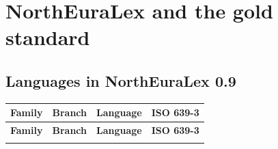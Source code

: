\appendix

\chapter{NorthEuraLex and the gold standard}
\section{Languages in NorthEuraLex 0.9}

\begin{center}
\small
\begin{longtable}{llll}
\hline\hline
\textbf{Family} & \textbf{Branch} & \textbf{Language} & \textbf{ISO 639-3}\\
\hline
\endfirsthead
\hline\hline
\textbf{Family} & \textbf{Branch} & \textbf{Language} & \textbf{ISO 639-3}\\
\hline
\endhead
\hline
\endfoot
\hline
\endlastfoot



\end{longtable}
\end{center}
